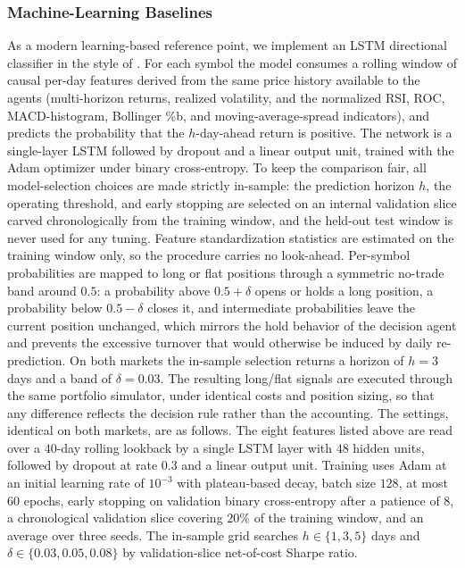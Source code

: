 \documentclass{ieeeaccess}
\newcommand{\LSTMhorizon}{\ensuremath{3}}
\newcommand{\LSTMband}{\ensuremath{0.03}}
\begin{document}
\subsubsection{Machine-Learning Baselines}
\label{subsec:lstm}
As a modern learning-based reference point, we implement an LSTM directional classifier in the style of \cite{fischerkrauss2018}. For each symbol the model consumes a rolling window of causal per-day features derived from the same price history available to the agents (multi-horizon returns, realized volatility, and the normalized RSI, ROC, MACD-histogram, Bollinger \%b, and moving-average-spread indicators), and predicts the probability that the $h$-day-ahead return is positive. The network is a single-layer LSTM followed by dropout and a linear output unit, trained with the Adam optimizer under binary cross-entropy. To keep the comparison fair, all model-selection choices are made strictly in-sample: the prediction horizon $h$, the operating threshold, and early stopping are selected on an internal validation slice carved chronologically from the training window, and the held-out test window is never used for any tuning. Feature standardization statistics are estimated on the training window only, so the procedure carries no look-ahead. Per-symbol probabilities are mapped to long or flat positions through a symmetric no-trade band around $0.5$: a probability above $0.5 + \delta$ opens or holds a long position, a probability below $0.5 - \delta$ closes it, and intermediate probabilities leave the current position unchanged, which mirrors the hold behavior of the decision agent and prevents the excessive turnover that would otherwise be induced by daily re-prediction. On both markets the in-sample selection returns a horizon of $h = \LSTMhorizon$ days and a band of $\delta = \LSTMband$. The resulting long/flat signals are executed through the same portfolio simulator, under identical costs and position sizing, so that any difference reflects the decision rule rather than the accounting. The settings, identical on both markets, are as follows. The eight features listed above are read over a $40$-day rolling lookback by a single LSTM layer with $48$ hidden units, followed by dropout at rate $0.3$ and a linear output unit. Training uses Adam at an initial learning rate of $10^{-3}$ with plateau-based decay, batch size $128$, at most $60$ epochs, early stopping on validation binary cross-entropy after a patience of $8$, a chronological validation slice covering $20\%$ of the training window, and an average over three seeds. The in-sample grid searches $h \in \{1, 3, 5\}$ days and $\delta \in \{0.03, 0.05, 0.08\}$ by validation-slice net-of-cost Sharpe ratio.
\end{document}
